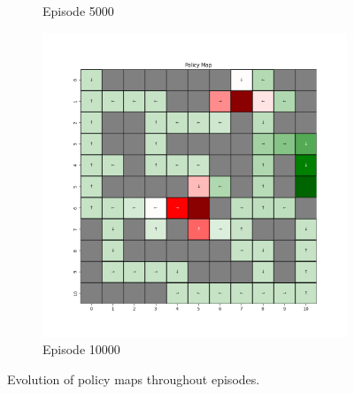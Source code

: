 \documentclass{assignment}
\begin{document}
\begin{figure}[H]
\begin{subfigure}{0.3\textwidth}
    \caption{Episode 5000}
    \end{subfigure}\hfill
    \begin{subfigure}{0.3\textwidth}
        \includegraphics[width=\textwidth]{figures/policy_td/gamma_sweep/policy_alpha_0.1_gamma_0.75_epsilon_0.2_iteration_10000.png}
    \caption{Episode 10000}
    \end{subfigure}
    \caption{Evolution of policy maps throughout episodes.}
    \label{fig:gamma_0.75_td_learning_policy}
\end{figure}
\end{document}
